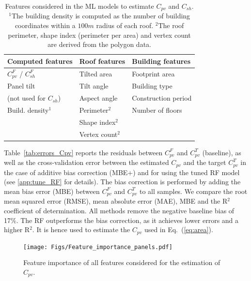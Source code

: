 \begin{table}[b]
\centering
\footnotesize
\begin{tabular}{lll}
\hline
\textbf{Computed features}               & \textbf{Roof features} & \textbf{Building features} \\
\hline
$C_{pv}^F$ / $C_{sh}^F$ & Tilted area                          & Footprint area                              \\
Panel tilt   & Tilt angle                          & Building type                              \\
(not used for $C_{sh}$)      & Aspect angle                        & Construction period          \\
Build. density$^1$                    & Perimeter$^2$                       & Number of floors                             \\
                                 & Shape index$^2$                       &   \\
 & Vertex count$^2$ & \\ 
\hline                                
\end{tabular}
\caption{Features considered in the ML models to estimate $C_{pv}$ and $C_{sh}$. $^1$The building density is computed as the number of building coordinates within a $100m$ radius of each roof. $^2$The roof perimeter, shape index (perimeter per area) and vertex count are derived from the polygon data.}
\label{tab:features}
\end{table}

Table~\ref{tab:errors_Cpv} reports the residuals between $C_{pv}^F$ and $C_{pv}^T$ (baseline), as well as the cross-validation error between the estimated $C_{pv}$ and the target $C_{pv}^T$ in the case of additive bias correction (MBE+) and for using the tuned RF model (see \ref{app:tune_RF} for details).
The bias correction is performed by adding the mean bias error (MBE) between $C_{pv}^F$ and $C_{pv}^T$  to all samples. 
We compare the root mean squared error (RMSE), mean absolute error (MAE), MBE and the R$^2$ coefficient of determination. All methods remove the negative baseline bias of 17\%. The RF outperforms the bias correction, as it achieves lower errors and a higher R$^2$. It is hence used to estimate the $C_{pv}$ used in Eq.~(\ref{eq:area}).

\begin{figure}[tb]
\centering
  \texttt{[image: Figs/Feature\_importance\_panels.pdf]}
\caption{Feature importance of all features considered for the estimation of $C_{pv}$.
}
\label{fig:RF_Cpv}
\end{figure}

